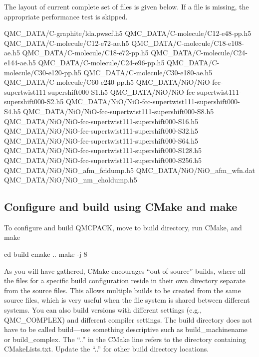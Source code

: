 The layout of current complete set of files is given below. If a file is missing, the appropriate performance test is skipped.
%
\begin{shade}
QMC_DATA/C-graphite/lda.pwscf.h5
QMC_DATA/C-molecule/C12-e48-pp.h5 
QMC_DATA/C-molecule/C12-e72-ae.h5 
QMC_DATA/C-molecule/C18-e108-ae.h5
QMC_DATA/C-molecule/C18-e72-pp.h5 
QMC_DATA/C-molecule/C24-e144-ae.h5
QMC_DATA/C-molecule/C24-e96-pp.h5 
QMC_DATA/C-molecule/C30-e120-pp.h5
QMC_DATA/C-molecule/C30-e180-ae.h5
QMC_DATA/C-molecule/C60-e240-pp.h5
QMC_DATA/NiO/NiO-fcc-supertwist111-supershift000-S1.h5
QMC_DATA/NiO/NiO-fcc-supertwist111-supershift000-S2.h5
QMC_DATA/NiO/NiO-fcc-supertwist111-supershift000-S4.h5
QMC_DATA/NiO/NiO-fcc-supertwist111-supershift000-S8.h5
QMC_DATA/NiO/NiO-fcc-supertwist111-supershift000-S16.h5
QMC_DATA/NiO/NiO-fcc-supertwist111-supershift000-S32.h5
QMC_DATA/NiO/NiO-fcc-supertwist111-supershift000-S64.h5
QMC_DATA/NiO/NiO-fcc-supertwist111-supershift000-S128.h5
QMC_DATA/NiO/NiO-fcc-supertwist111-supershift000-S256.h5
QMC_DATA/NiO/NiO_afm_fcidump.h5
QMC_DATA/NiO/NiO_afm_wfn.dat
QMC_DATA/NiO/NiO_nm_choldump.h5
\end{shade}


\subsection{Configure and build using CMake and make}
To configure and build QMCPACK, move to build directory, run CMake, and make

\begin{shade}
cd build
cmake ..
make -j 8
\end{shade}

As you will have gathered, CMake encourages ``out of source'' builds,
where all the files for a specific build configuration reside in their
own directory separate from the source files. This allows multiple
builds to be created from the same source files, which is very useful
when the file system is shared between different systems. You can also
build versions with different settings (e.g., QMC\_COMPLEX) and
different compiler settings. The build directory does not have to be
called build---use something descriptive such as build\_machinename or
build\_complex. The ``..'' in the CMake line refers to the directory
containing CMakeLists.txt. Update the ``..'' for other build
directory locations.

